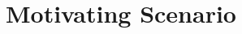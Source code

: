\documentclass[journal]{IEEEtran}
\theoremstyle{definition}
\newcommand\patrizio[1]{\nb{Patrizio}{#1}}
\newcommand\ivano[1]{\nb{Ivano}{#1}}
\newcommand\todo[1]{\nb{Todo}{#1}}
\begin{document}








\section{Motivating Scenario}
\label{sec:motivation}
\end{document}
